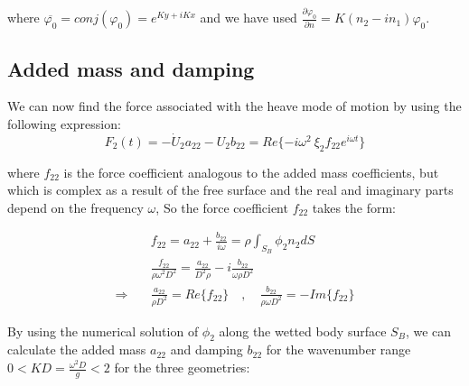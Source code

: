 \documentclass[a4paper,10pt]{article}
\newcommand{\dd}{\partial}
\begin{document}
where $\overline{\varphi_0} = conj({\varphi_0}) = e^{K y + i K x}$ and we have used $\frac{\dd \varphi_0}{\dd n} = K(n_2 - i n_1) \varphi_0$.

\subsection{Added mass and damping}
We can now find the force associated with the heave mode of motion by using the following expression:
\begin{equation}
F_2 (t) = - \dot{U}_2 a_{22} - U_2 b_{22} =  Re\{- i\omega^2\ \xi_2 f_{22} e^{i \omega t} \}
\end{equation}

where $f_{22}$ is the force coefficient analogous to the added mass coefficients, but which is complex as a result of the free surface and the real and imaginary parts depend on the frequency $\omega$, So the force coefficient $f_{22}$ takes the form:

\begin{align}
&f_{22} = a_{22} + \frac{b_{22}}{i \omega} = \rho \int_{S_B} \phi_2 n_2 dS\\[1 em]
&\frac{f_{22}}{\rho \omega^2 D^2} = \frac{a_{22}}{D^2 \rho} - i \frac{b_{22}}{\omega \rho D^2}\\[1 em]
\Rightarrow \quad &\frac{a_{22}}{\rho D^2} = Re\{f_{22}\} \quad , \quad \frac{b_{22}}{\rho \omega D^2} = -Im\{f_{22}\}
\end{align}

By using the numerical solution of $\phi_2$ along the wetted body surface $S_B$, we can calculate the added mass $a_{22}$ and damping $b_{22}$ for the wavenumber range $0 < KD=\frac{\omega^2 D}{g} < 2$ for the three geometries:
\end{document}
